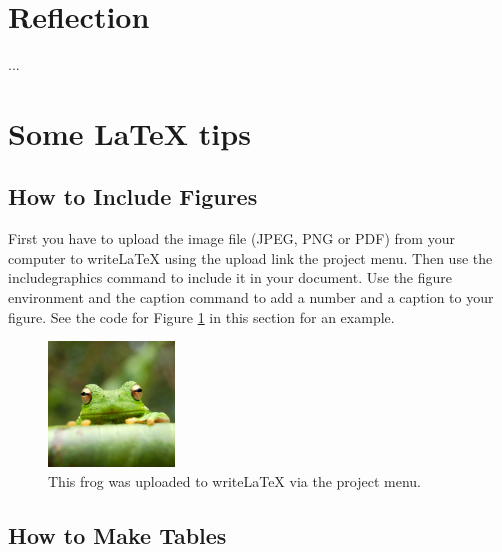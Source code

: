 \documentclass[a4paper]{article}
\begin{document}
\section{Reflection}
...






























\newpage
\section{Some LaTeX tips}
\label{sec:latex}
\subsection{How to Include Figures}

First you have to upload the image file (JPEG, PNG or PDF) from your computer to writeLaTeX using the upload link the project menu. Then use the includegraphics command to include it in your document. Use the figure environment and the caption command to add a number and a caption to your figure. See the code for Figure \ref{fig:frog} in this section for an example.

\begin{figure}[ht]
\centering
\includegraphics[width=0.3\textwidth]{frog.jpg}
\caption{\label{fig:frog}This frog was uploaded to writeLaTeX via the project menu.}
\end{figure}

\subsection{How to Make Tables}
\end{document}
